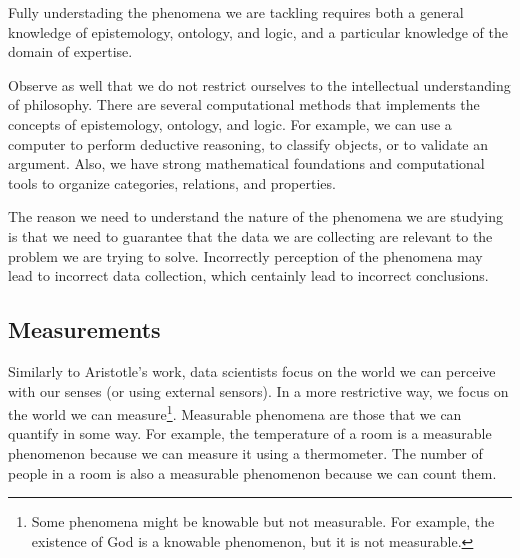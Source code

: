 Fully understading the phenomena we are tackling requires both a general knowledge
of epistemology, ontology, and logic, and a particular knowledge of the domain of
expertise.

Observe as well that we do not restrict ourselves to the intellectual understanding of
philosophy.  There are several computational methods that implements the concepts of
epistemology, ontology, and logic.  For example, we can use a computer to perform
deductive reasoning, to classify objects, or to validate an argument.  Also, we have
strong mathematical foundations and computational tools to organize categories, relations, and
properties.

The reason we need to understand the nature of the phenomena we are studying is that we
need to guarantee that the data we are collecting are relevant to the problem we are
trying to solve.  Incorrectly perception of the phenomena may lead to incorrect data
collection, which centainly lead to incorrect conclusions.


\subsection{Measurements}

Similarly to Aristotle's work, data scientists focus on the world we can perceive with our
senses (or using external sensors).  In a more restrictive way, we focus on the world we
can measure\footnote{Some phenomena might be knowable but not measurable.  For example,
the existence of God is a knowable phenomenon, but it is not measurable.}. Measurable
phenomena are
those that we can quantify in some way.  For example, the temperature of a room is a
measurable phenomenon because we can measure it using a thermometer.  The number of
people in a room is also a measurable phenomenon because we can count them.

